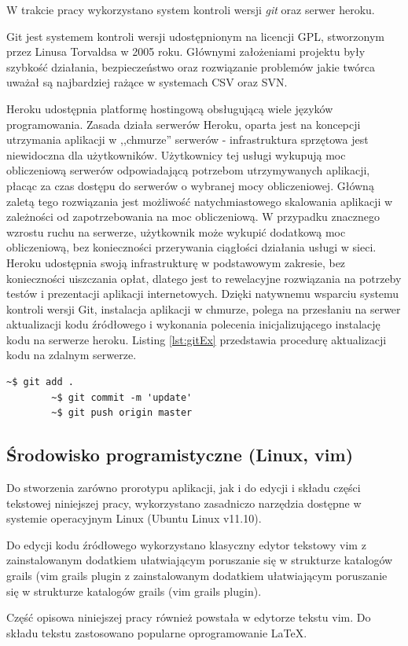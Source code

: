   W trakcie pracy wykorzystano system kontroli wersji \emph{git} oraz serwer heroku. 

  Git jest systemem kontroli wersji udostępnionym na licencji GPL, stworzonym przez Linusa Torvaldsa w 2005 roku. Głównymi założeniami projektu były szybkość działania, bezpieczeństwo oraz rozwiązanie problemów jakie twórca uważał są najbardziej rażące w systemach CSV oraz SVN.

  Heroku udostępnia platformę hostingową obsługującą wiele języków programowania. Zasada działa serwerów Heroku, oparta jest na koncepcji utrzymania aplikacji w ,,chmurze'' serwerów - infrastruktura sprzętowa jest niewidoczna dla użytkowników. Użytkownicy tej usługi wykupują moc obliczeniową serwerów odpowiadającą potrzebom utrzymywanych aplikacji, płacąc za czas dostępu do serwerów o wybranej mocy obliczeniowej. Główną zaletą tego rozwiązania jest możliwość natychmiastowego skalowania aplikacji w zależności od zapotrzebowania na moc obliczeniową. W przypadku znacznego wzrostu ruchu na serwerze, użytkownik może wykupić dodatkową moc obliczeniową, bez konieczności przerywania ciągłości działania usługi w sieci. Heroku udostępnia swoją infrastrukturę w podstawowym zakresie, bez konieczności uiszczania opłat, dlatego jest to rewelacyjne rozwiązania na potrzeby testów i prezentacji aplikacji internetowych. Dzięki natywnemu wsparciu systemu kontroli wersji Git, instalacja aplikacji w chmurze, polega na przesłaniu na serwer aktualizacji kodu źródłowego i wykonania polecenia inicjalizującego instalację kodu na serwerze heroku. Listing \ref{lst:gitEx} przedstawia procedurę aktualizacji kodu na zdalnym serwerze.


        \begin{lstlisting}[caption={Commit i wysłanie kodu na serwer Heroku}, label={lst:gitEx}]
        ~$ git add .
        ~$ git commit -m 'update'
        ~$ git push origin master
        \end{lstlisting}

\subsection{Środowisko programistyczne (Linux, vim)}

  Do stworzenia zarówno prorotypu aplikacji, jak i do edycji i składu części tekstowej niniejszej pracy, wykorzystano zasadniczo narzędzia dostępne w systemie operacyjnym Linux (Ubuntu Linux v11.10). 

  Do edycji kodu źródłowego wykorzystano klasyczny edytor tekstowy vim z zainstalowanym dodatkiem ułatwiającym poruszanie się w strukturze katalogów grails (vim grails plugin z zainstalowanym dodatkiem ułatwiającym poruszanie się w strukturze katalogów grails (vim grails plugin).

  Część opisowa niniejszej pracy również powstała w edytorze tekstu vim. Do składu tekstu zastosowano popularne oprogramowanie \LaTeX. 
